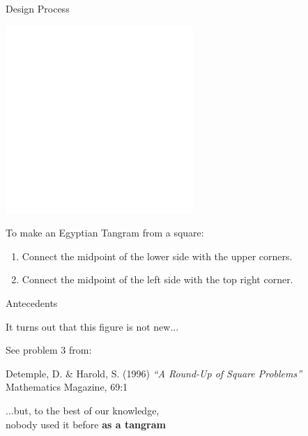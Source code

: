 \documentclass[14pt]{beamer}
\begin{document}
    \begin{frame}{Design Process}
        \begin{center}
            \includegraphics[height=18ex]{figures/figure001b.pdf}
        \end{center}

        To make an Egyptian Tangram from a square:

        {\small \begin{enumerate}
            \item Connect the midpoint of the lower side with the upper corners.
            \item Connect the midpoint of the left side with the top right corner.
        \end{enumerate}}
    \end{frame}


    \begin{frame}{Antecedents}
        \begin{center}
            It turns out that this figure is not new...

            \bigskip \bigskip \bigskip

            {\small See problem 3 from:}

            \medskip

            {\footnotesize Detemple, D. \& Harold, S. (1996) \emph{``A Round-Up of Square Problems''} Mathematics Magazine, 69:1}

            \bigskip \bigskip \bigskip

            ...but, to the best of our knowledge,\\nobody used it before \textbf{as a tangram}
        \end{center}
    \end{frame}

\end{document}
